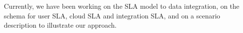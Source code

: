 \documentclass[11pt,a4paper,oneside]{report}
\begin{document}

Currently, we have been working on the SLA model to data integration, on the schema for user SLA, cloud SLA and integration SLA, and on a scenario description to illustrate our approach.  %

\end{document}

